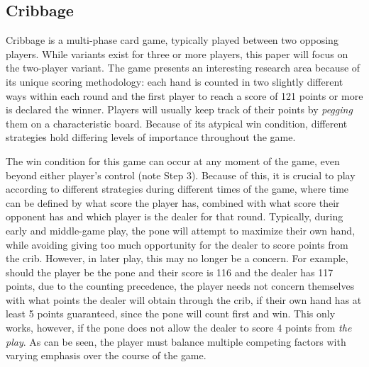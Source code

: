 

\subsection{Cribbage}

Cribbage is a multi-phase card game, typically played between two opposing
players.
%
While variants exist for three or more players, this paper will focus on the
two-player variant.
%
The game presents an interesting research area because of its unique scoring
methodology:
each hand is counted in two slightly different ways within each round and the
first player to reach a score of 121 points or more is declared the winner.
%
Players will usually keep track of their points by \textit{pegging} them on a 
characteristic board.
%
Because of its atypical win condition, different strategies hold differing
levels of importance throughout the game.




The win condition for this game can occur at any moment of the game,
even beyond either player's control (note Step 3).
%
Because of this,
it is crucial to play according to different strategies during
different times of the game,
where time can be defined by what score the player has,
combined with what score their opponent has
and which player is the dealer for that round.
%
Typically, during early and middle-game play,
the pone will attempt to maximize their own hand,
while avoiding giving too much opportunity for the dealer to score points from
the crib.
%
However, in later play, this may no longer be a concern.
%
For example, should the player be the pone and their score is 116
and the dealer has 117 points,
due to the counting precedence,
the player needs not concern themselves with what points the dealer will obtain
through the crib, if their own hand has at least 5 points guaranteed,
since the pone will count first and win.
%
This only works, however, if the pone does not allow the dealer to score 4
points from \textit{the play}.
%
As can be seen, the player must balance multiple competing factors with varying
emphasis over the course of the game.

%	

